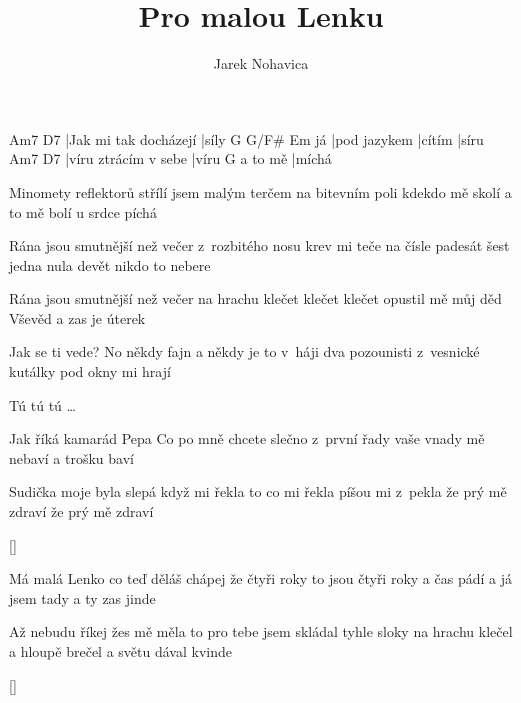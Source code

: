 \documentclass{song}
\author{Jarek Nohavica}
\title{Pro malou Lenku}
\begin{document}
\begin{multicols}{2}
\strophe
Am7                   D7
|Jak mi tak docházejí |síly
   G            G/F\#  Em
já |pod jazykem |cítím |síru
Am7                  D7
|víru ztrácím v sebe |víru
        G
a to mě |míchá
\endstrophe

\columnbreak
\strophe*
Minomety reflektorů střílí
jsem malým terčem na bitevním poli
kdekdo mě skolí a to mě bolí
u srdce píchá
\endstrophe
\end{multicols}

Rána jsou smutnější než večer
z~rozbitého nosu krev mi teče
na čísle padesát šest jedna nula devět
nikdo to nebere

Rána jsou smutnější než večer
na hrachu klečet klečet klečet
opustil mě můj děd Vševěd
a zas je úterek

Jak se ti vede?
No někdy fajn a někdy je to v~háji
dva pozounisti z~vesnické kutálky
pod okny mi hrají

Tú tú tú \ldots
\endstrophe

\begin{multicols}{2}
\strophe*
Jak říká kamarád Pepa
Co po mně chcete slečno z~první řady
vaše vnady mě nebaví
a trošku baví
\endstrophe

\strophe*
Sudička moje byla slepá
když mi řekla to co mi řekla
píšou mi z~pekla že prý mě zdraví
že prý mě zdraví
\endstrophe
\end{multicols}

\ref{}

\begin{multicols}{2}
\strophe*
Má malá Lenko co teď děláš
chápej že čtyři roky to jsou čtyři roky
a čas pádí a já jsem tady
a ty zas jinde
\endstrophe

\strophe*
Až nebudu říkej žes mě měla
to pro tebe jsem skládal tyhle sloky
na hrachu klečel a hloupě brečel
a světu dával kvinde
\endstrophe
\end{multicols}

\ref{}
\end{document}
